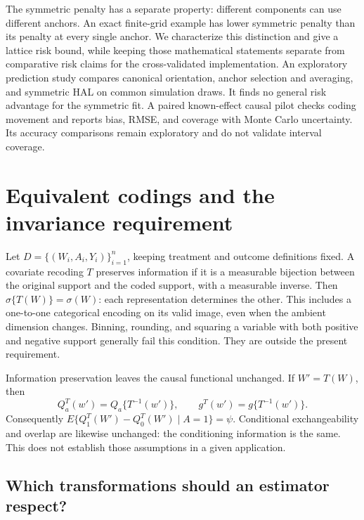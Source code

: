 \documentclass[11pt]{article}
\theoremstyle{definition}
\theoremstyle{remark}
\begin{document}
The symmetric penalty has a separate property: different components can use
different anchors. An exact finite-grid example has lower symmetric penalty
than its penalty at every single anchor. We characterize this distinction
and give a lattice risk bound, while keeping those mathematical statements
separate from comparative risk claims for the cross-validated implementation.
An exploratory prediction study compares canonical orientation, anchor
selection and averaging, and symmetric HAL on common simulation draws.
It finds no general risk advantage for the symmetric fit. A paired
known-effect causal pilot checks coding movement and reports bias, RMSE,
and coverage with Monte Carlo uncertainty. Its accuracy comparisons remain
exploratory and do not validate interval coverage.

\section{Equivalent codings and the invariance requirement}\label{sec:recodings}

Let $D=\{(W_i,A_i,Y_i)\}_{i=1}^n$, keeping treatment and outcome definitions
fixed. A covariate recoding $T$ preserves information if it is a measurable
bijection between the original support and the coded support, with a
measurable inverse. Then $\sigma\{T(W)\}=\sigma(W)$: each representation
determines the other. This includes a one-to-one categorical encoding on
its valid image, even when the ambient dimension changes. Binning, rounding,
and squaring a variable with both positive and negative support generally
fail this condition. They are outside the present requirement.

Information preservation leaves the causal functional unchanged. If
$W'=T(W)$, then
\[
 Q_a^T(w')=Q_a\{T^{-1}(w')\},\qquad
 g^T(w')=g\{T^{-1}(w')\}.
\]
Consequently $E\{Q_1^T(W')-Q_0^T(W')\mid A=1\}=\psi$.
Conditional exchangeability and overlap are likewise unchanged: the
conditioning information is the same. This does not establish those
assumptions in a given application.

\subsection{Which transformations should an estimator respect?}
\end{document}
